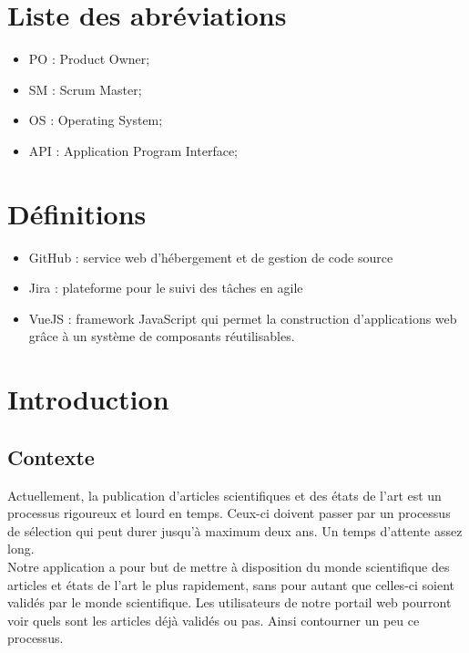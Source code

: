\documentclass[t, 12pt, usenames,dvipsnames]{article}
\begin{document}
    \newpage
    \tableofcontents
    
    \newpage
    \section{Liste des abréviations}
        \begin{itemize}
            \item PO : Product Owner;
            \item SM : Scrum Master;
            \item OS : Operating System;
            \item API : Application Program Interface;
        \end{itemize}
    
    \section{Définitions}
        \begin{itemize}
            \item GitHub : service web d'hébergement et de gestion de code source
            \item Jira : plateforme pour le suivi des tâches en agile
            \item VueJS : framework JavaScript qui permet la construction d'applications web grâce à un système de composants réutilisables.
        \end{itemize}
    \newpage
    \section{Introduction}
    
        \subsection{Contexte}
            \noindent Actuellement, la publication d'articles scientifiques et des états de l'art est un processus rigoureux et lourd en temps. Ceux-ci doivent passer par un processus de sélection qui peut durer jusqu'à maximum deux ans. Un temps d'attente assez long.\\
            Notre application a pour but de mettre à disposition du monde scientifique des articles et états de l'art le plus rapidement, sans pour autant que celles-ci soient validés par le monde scientifique. Les utilisateurs de notre portail web pourront voir quels sont les articles déjà validés ou pas. Ainsi contourner un peu ce processus. 
            
\end{document}
